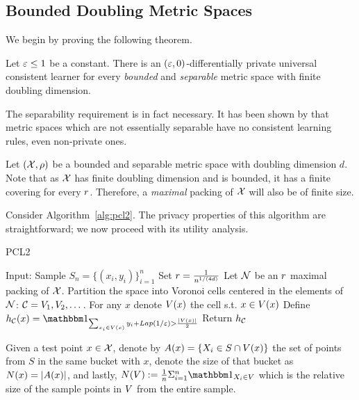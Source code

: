 \documentclass[12pt,a4paper,oneside,onecolumn]{book}
\begin{document}
\subsection{Bounded Doubling Metric Spaces}

We begin by proving the following theorem.

\begin{theorem}\label{thm:bounded-doubling}
Let $\varepsilon\leq1$ be a constant.
There is an $(\varepsilon,0)$-differentially private universal consistent learner for every {\em bounded} and {\em separable} metric space with finite doubling dimension.
\end{theorem}

\begin{remark}
The separability requirement is in fact necessary. 
It has been shown by \citet{10.1214/20-AOS2029} that metric spaces which are not essentially separable have no consistent learning rules, even non-private ones.
\end{remark}

Let $(\mathcal{X},\rho)$ be a bounded and separable metric space with doubling dimension $d$.
Note that as $\mathcal{X}$ has finite doubling dimension and is bounded, it has a finite covering for every $r$. Therefore, a {\em maximal} packing of $\mathcal{X}$ will also be of finite size. 

Consider Algorithm~\ref{alg:pcl2}. The privacy properties of this algorithm are straightforward; we now proceed with its utility analysis.

\begin{algorithm}
  \caption{PCL2}\label{alg:pcl2}
  \begin{algorithmic}[1]
    \State Input: Sample $S_n = \{(x_i,y_i)\}_{i=1}^n$ 
    \State Set $r=\frac{1}{n^{1/(4d)}}$
    \State Let $\mathcal{N}$ be an $r$ maximal packing of $\mathcal{X}$.
    \State Partition the space into Voronoi cells centered in the elements of $\mathcal{N}$: $\mathcal{C} = V_1,V_2,\dots$.
    \State For any $x$ denote $V(x)$ the cell s.t. $x \in V(x)$   
    \State Define 
    $h_{\partition}(x) = \indicator{\sum_{x_i\in \voronoi(x)} y_i + Lap(1/\eps) > \frac{|\voronoi(x)|}{2}}$ \label{alg:PCL2_define_h}
    \State Return $h_{\mathcal{C}}$
  \end{algorithmic}
\end{algorithm}

Given a test point $x\in \mathcal{X}$, denote by $A(x) =  \{X_i \in S \cap V(x) \}$ the set of points from $S$ in the same bucket with $x$,
denote the size of that bucket as $N(x)=|A(x)|$, and lastly, $\vorsize(\voronoi):=\frac{1}{n}\Sigma_{i=1}^{n}{\indicator{X_i \in \voronoi}}$ which is the relative size of the sample points in $V$ from the entire sample. 
\end{document}
